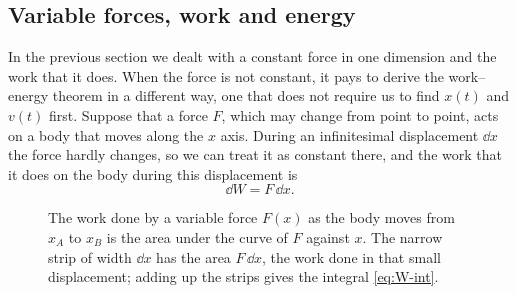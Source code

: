 \documentclass[11pt,a4paper]{article}
\begin{document}
\subsection{Variable forces, work and energy}\label{sec:variable}

In the previous section we dealt with a constant force in one dimension and the work that it does.
When the force is not constant, it pays to derive the work--energy theorem in a different way, one
that does not require us to find $x(t)$ and $v(t)$ first. Suppose that a force $F$, which may change
from point to point,
acts on a body that moves along the $x$ axis. During an infinitesimal displacement $\dd x$ the force
hardly changes, so we can treat it as constant there, and the work that it does on the body during
this displacement is
\begin{equation}\label{eq:dW}
  \dd W = F\,\dd x .
\end{equation}
\begin{figure}[ht]
\centering
{}
\caption{The work done by a variable force $F(x)$ as the body moves from $x_A$ to $x_B$ is the area
under the curve of $F$ against $x$. The narrow strip of width $\dd x$ has the area $F\,\dd x$, the
work done in that small displacement; adding up the strips gives the integral
\eqref{eq:W-int}.}\label{fig:area}
\end{figure}
\end{document}
